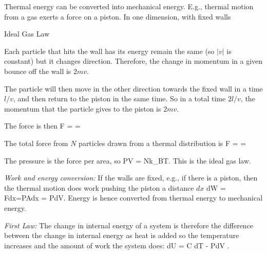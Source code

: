\documentclass[11pt]{book}
\begin{document}
Thermal energy can be converted into mechanical energy.  E.g., thermal motion from a gas exerts a force on a piston. In one dimension, with fixed walls
\bee 
\item Ideal Gas Law
\bei
\item Each particle that hits the wall has its energy remain the same (so $|v|$ is constant) but it changes direction. Therefore, the change in momentum in a given bounce off the wall is $2mv$. 
\item The particle will then move in the other direction towards the fixed wall in a time $l/v$, and then return to the piston in the same time. So in a total time $2l/v$, the momentum that the particle gives to the piston is $2mv$. 
\item The force is then 
\be F =  = 
\ee
\item The total force from $N$ particles drawn from a thermal distribution is
\be
F =  = 
\ee
\item The pressure is the force per area, so
\be
PV = Nk_BT.
\ee
\eei
This is the ideal gas law.
\item {\it Work and energy conversion:}
If the walls are fixed, e.g., if there is a piston, then the thermal motion does work pushing the piston a distance $dx$
\be
dW = Fdx=PAdx = PdV.\ee
Energy is hence converted from thermal energy to mechanical energy.
\item {\it First Law:}
The change in internal energy of a system is therefore the difference between the change in internal energy as heat is added so the temperature increases and the amount of work the system does:
\be
dU = C dT - PdV
.\ee

\end{document}
